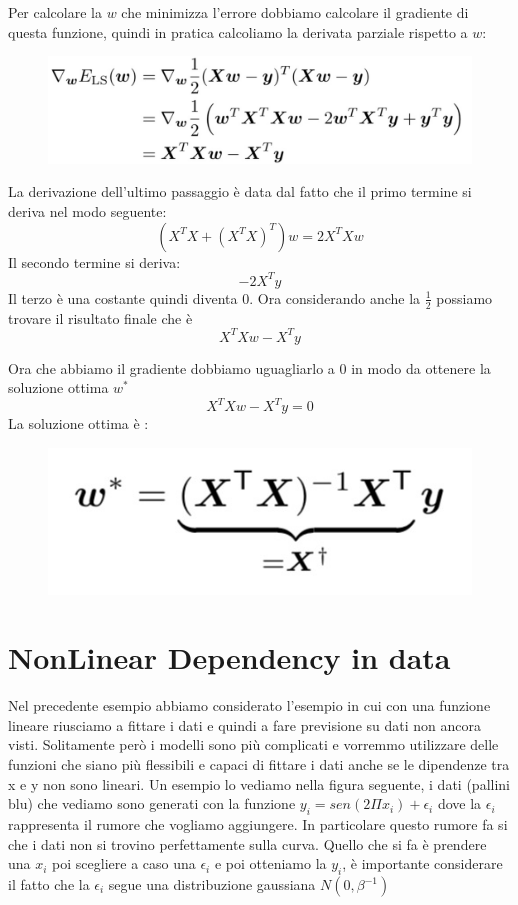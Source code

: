 \documentclass[14pt]{extreport}
\begin{document}
Per calcolare la $w$ che minimizza l'errore dobbiamo calcolare il gradiente di questa funzione, quindi in pratica calcoliamo la derivata parziale
rispetto a $w$:

\begin{figure}[H]
\centering
\includegraphics[width=0.6\linewidth]{69.jpeg}
\end{figure}

La derivazione dell'ultimo passaggio è data dal fatto che il primo termine si deriva nel modo seguente: $$(X^TX + (X^TX)^T)w = 2X^TXw$$ Il secondo
termine si deriva: $$-2X^Ty$$ Il terzo è una costante quindi diventa 0. Ora considerando anche la $\frac{1}{2}$ possiamo trovare il risultato finale
che è $$X^TXw-X^Ty$$

Ora che abbiamo il gradiente dobbiamo uguagliarlo a 0 in modo da ottenere la soluzione ottima $w^*$ $$X^TXw-X^Ty=0$$ La soluzione ottima è :

\begin{figure}[H]
\centering
\includegraphics[width=0.3\linewidth]{74.jpeg}
\end{figure}

\section{NonLinear Dependency in data}

Nel precedente esempio abbiamo considerato l'esempio in cui con una funzione lineare riusciamo a fittare i dati e quindi a fare previsione su dati non
ancora visti. Solitamente però i modelli sono più complicati e vorremmo utilizzare delle funzioni che siano più flessibili e capaci di fittare i dati
anche se le dipendenze tra x e y non sono lineari. Un esempio lo vediamo nella figura seguente, i dati (pallini blu) che vediamo sono generati con la
funzione $y_i=sen(2\Pi x_i) + \epsilon_i$ dove la $\epsilon_i$ rappresenta il rumore che vogliamo aggiungere. In particolare questo rumore fa si che i
dati non si trovino perfettamente sulla curva. Quello che si fa è prendere una $x_i$ poi scegliere a caso una $\epsilon_i$ e poi otteniamo la $y_i$, è
importante considerare il fatto che la $\epsilon_i$ segue una distribuzione gaussiana $N(0, \beta^{-1})$
\end{document}
